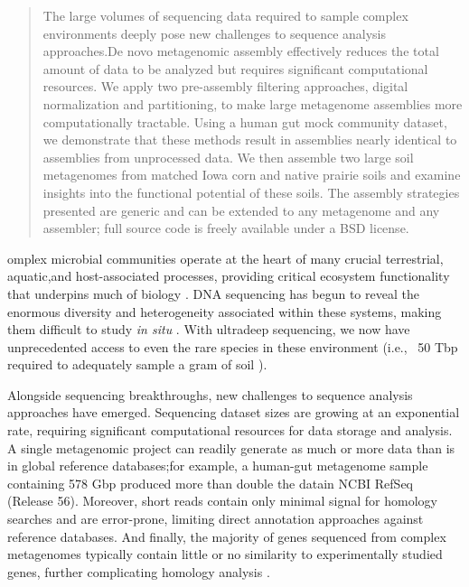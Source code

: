 \documentclass{pnastwo}
\begin{document}
\begin{article} \begin{abstract} The large volumes of sequencing data required
to sample complex environments deeply pose new challenges to sequence analysis
approaches.De novo metagenomic assembly effectively reduces the total amount of
data to be analyzed but requires significant computational resources. We apply
two pre-assembly filtering approaches, digital normalization and partitioning,
to make large metagenome assemblies more computationally tractable. Using a
human gut mock community dataset, we demonstrate that these methods result in
assemblies nearly identical to assemblies from unprocessed data. We then
assemble two large soil metagenomes from matched Iowa corn and native prairie
soils and examine insights into the functional potential of these soils.  The
assembly strategies presented are generic and can be extended to any metagenome
and any assembler; full source code is freely available under a BSD license.
\end{abstract}


omplex microbial communities operate at the heart of many crucial
terrestrial, aquatic,and host-associated processes, providing critical ecosystem
functionality that underpins much of biology
\cite{Arumugam:2011p735,Hess:2011p686,Iverson:2012p1281,
Mackelprang:2011p1087,Qin:2010p189,Tringe:2005p174,Venter:2004p170}. DNA
sequencing has begun to reveal the enormous diversity and heterogeneity
associated within these systems, making them difficult to study {\em in situ}
\cite{Hess:2011p686,Mackelprang:2011p1087,Qin:2010p189}. With ultradeep
sequencing, we now have unprecedented access to even the rare species in these
environment (i.e., ~50 Tbp required to adequately sample a gram of soil
\cite{Gans:2005p1365}).

Alongside sequencing breakthroughs, new challenges to sequence analysis
approaches have emerged. Sequencing dataset sizes are growing at an exponential
rate, requiring significant computational resources for data storage and
analysis. A single metagenomic project can readily generate as much or more data
than is in global reference databases;for example, a human-gut metagenome sample
containing 578 Gbp \cite{Qin:2010p189} produced more than double the datain NCBI
RefSeq (Release 56). Moreover, short reads contain only minimal signal for
homology searches and are error-prone, limiting direct annotation approaches
against reference databases. And finally, the majority of genes sequenced from
complex metagenomes typically contain little or no similarity to experimentally
studied genes, further complicating homology analysis
\cite{Arumugam:2011p735,Qin:2010p189}.


\end{article}
\end{document}
